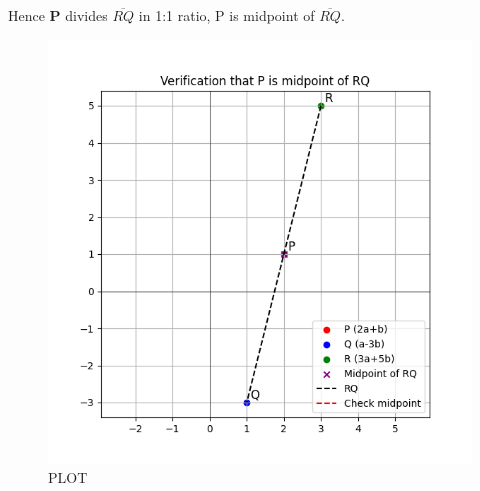 \documentclass[journal]{IEEEtran}
\begin{document}
\text Hence \textbf{P} divides $\overline{RQ}$ in 1:1 ratio, P is midpoint of $\overline{RQ}$.
\begin{figure}[H]
    \centering
    \includegraphics[width=0.75\columnwidth]{figs/graph-1.png}
    \caption{PLOT}
    \label{fig:placeholder}
\end{figure}
\end{document}
